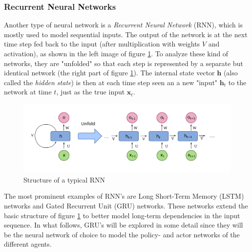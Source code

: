 \subsubsection{Recurrent Neural Networks}
Another type of neural network is a \emph{Recurrent Neural Network} (RNN), which is mostly used to model sequential inputs. The output of the network is at the next time step fed back to the input (after multiplication with weights $V$ and activation), as shown in the left image of figure \ref{fig:rnn}. To analyze these kind of networks, they are "unfolded" so that each step is represented by a separate but identical network (the right part of figure \ref{fig:rnn}). The internal state vector $\bm{h}$ (also called the \emph{hidden state}) is then at each time step seen an a new "input" $\bm{h}_t$ to the network at time $t$, just as the true input $\bm{x}_t$.\\
\begin{figure}[htp]
    \centering
    \includegraphics[width=14cm]{images/rnn.png}
    \caption{Structure of a typical RNN}
    \label{fig:rnn}
\end{figure}
The most prominent examples of RNN's are Long Short-Term Memory (LSTM) \cite{hochreiter1997long} networks and Gated Recurrent Unit (GRU) \cite{cho2014learning} networks. These networks extend the basic structure of figure \ref{fig:rnn} to better model long-term dependencies in the input sequence. In what follows, GRU's will be explored in some detail since they will be the neural network of choice to model the policy- and actor networks of the different agents.\\

